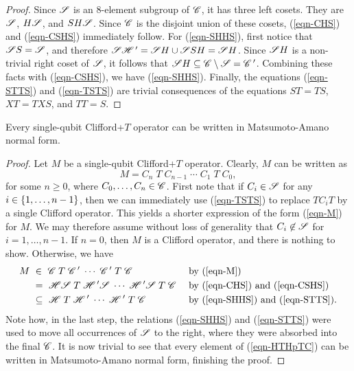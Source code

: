 \begin{proof}
  Since $\mathscr{S}$ is an 8-element subgroup of $\mathscr{C}$, it has three left cosets. They are $\mathscr{S}$, $H\mathscr{S}$,
  and $SH\mathscr{S}$. Since $\mathscr{C}$ is the disjoint union of these cosets, (\ref{eqn-CHS}) and
  (\ref{eqn-CSHS}) immediately follow. For (\ref{eqn-SHHS}), first notice that $\mathscr{S} S=\mathscr{S}$, and
  therefore $\mathscr{S}\mathscr{H}\,' = \mathscr{S} H\cup \mathscr{S} SH = \mathscr{S} H$. Since $\mathscr{S} H$ is a non-trivial right coset of
  $\mathscr{S}$, it follows that $\mathscr{S} H \subseteq \mathscr{C}\setminus\mathscr{S} = \mathscr{C}\,'$. Combining these facts with
  (\ref{eqn-CSHS}), we have (\ref{eqn-SHHS}). Finally, the equations (\ref{eqn-STTS}) and
  (\ref{eqn-TSTS}) are trivial consequences of the equations $ST=TS$, $XT=TXS$, and $TT=S$.
\end{proof}

\begin{proposition}\label{prop-ma}
  Every single-qubit Clifford+$T$ operator can be written in Matsumoto-Amano normal form.
\end{proposition}

\begin{proof}
  Let $M$ be a single-qubit Clifford+$T$ operator. Clearly, $M$ can be written as
  \begin{equation}\label{eqn-M}
    M = C_n\;T\;C_{n-1}\;\cdots\;C_1\;T\;C_0,
  \end{equation}
  for some $n\geq 0$, where $C_0,\ldots,C_n\in\mathscr{C}$. First note that if $C_i\in\mathscr{S}$ for any
  $i\in\{1,\ldots,n-1\}$, then we can immediately use (\ref{eqn-TSTS}) to replace $TC_iT$ by a
  single Clifford operator. This yields a shorter expression of the form (\ref{eqn-M}) for $M$. We
  may therefore assume without loss of generality that $C_i\not\in\mathscr{S}$ for $i=1,\ldots,n-1$. If
  $n=0$, then $M$ is a Clifford operator, and there is nothing to show. Otherwise, we have
  \begin{align}
    M ~&\in~ \mathscr{C}\;T\;\mathscr{C}\,'\;\cdots\;\mathscr{C}\,'\;T\;\mathscr{C} &&\mbox{ by (\ref{eqn-M})}\\
    &=~ \mathscr{H}\mathscr{S}\;T\;\mathscr{H}\,'\mathscr{S}\;\cdots\;\mathscr{H}\,'\mathscr{S}\;T\;\mathscr{C} &&\mbox{ by
      (\ref{eqn-CHS}) and (\ref{eqn-CSHS})}\\
    &\subseteq~ \mathscr{H}\;T\;\mathscr{H}\,'\;\cdots\;\mathscr{H}\,'\;T\;\mathscr{C} &&\mbox{ by
      (\ref{eqn-SHHS}) and (\ref{eqn-STTS}).}\label{eqn-HTHpTC}
  \end{align}
  Note how, in the last step, the relations (\ref{eqn-SHHS}) and (\ref{eqn-STTS}) were used to move
  all occurrences of $\mathscr{S}$ to the right, where they were absorbed into the final $\mathscr{C}$. It is now
  trivial to see that every element of (\ref{eqn-HTHpTC}) can be written in Matsumoto-Amano normal
  form, finishing the proof.
\end{proof}

